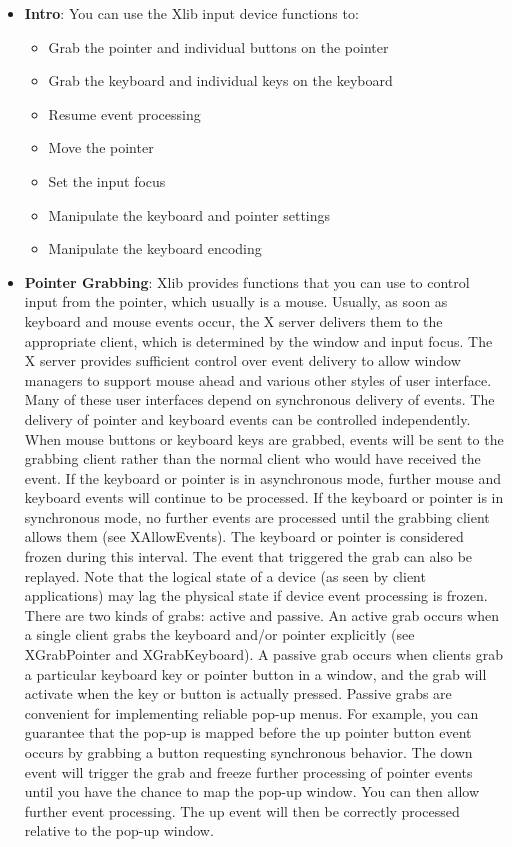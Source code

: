 \documentclass{report}
\begin{document}
    \pagebreak 
    \begin{itemize}
        \item \textbf{Intro}:  You can use the Xlib input device functions to:
            \begin{itemize}
                \item Grab the pointer and individual buttons on the pointer
                \item Grab the keyboard and individual keys on the keyboard
                \item Resume event processing
                \item Move the pointer
                \item Set the input focus
                \item Manipulate the keyboard and pointer settings
                \item Manipulate the keyboard encoding
            \end{itemize}
        \item \textbf{Pointer Grabbing}: Xlib provides functions that you can use to control input from the pointer, which usually is a mouse. Usually, as soon as keyboard and mouse events occur, the X server delivers them to the appropriate client, which is determined by the window and input focus. The X server provides sufficient control over event delivery to allow window managers to support mouse ahead and various other styles of user interface. Many of these user interfaces depend on synchronous delivery of events. The delivery of pointer and keyboard events can be controlled independently. 
            \bigbreak \noindent 
            When mouse buttons or keyboard keys are grabbed, events will be sent to the grabbing client rather than the normal client who would have received the event. If the keyboard or pointer is in asynchronous mode, further mouse and keyboard events will continue to be processed. If the keyboard or pointer is in synchronous mode, no further events are processed until the grabbing client allows them (see XAllowEvents). The keyboard or pointer is considered frozen during this interval. The event that triggered the grab can also be replayed.
            \bigbreak \noindent 
            Note that the logical state of a device (as seen by client applications) may lag the physical state if device event processing is frozen.
            \bigbreak \noindent 
            There are two kinds of grabs: active and passive. An active grab occurs when a single client grabs the keyboard and/or pointer explicitly (see XGrabPointer and XGrabKeyboard). A passive grab occurs when clients grab a particular keyboard key or pointer button in a window, and the grab will activate when the key or button is actually pressed. Passive grabs are convenient for implementing reliable pop-up menus. For example, you can guarantee that the pop-up is mapped before the up pointer button event occurs by grabbing a button requesting synchronous behavior. The down event will trigger the grab and freeze further processing of pointer events until you have the chance to map the pop-up window. You can then allow further event processing. The up event will then be correctly processed relative to the pop-up window.

\end{itemize}
\end{document}
